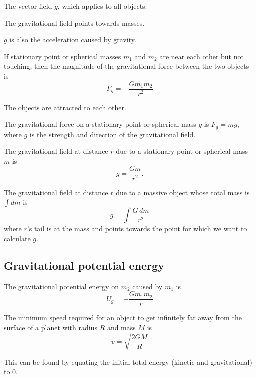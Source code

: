 \begin{definition}
  The vector field $g$, which applies to all objects.

  The gravitational field points towards masses.

	$g$ is also the acceleration caused by gravity.
\end{definition}

\begin{namedlaw}
  If stationary point or spherical masses $m_1$ and $m_2$ are near each other but not touching, then the magnitude of the gravitational force between the two objects is
  \[
    F_g = -\frac{G m_1 m_2}{r^2}
  \]

	The objects are attracted to each other.
\end{namedlaw}

\begin{law}
  The gravitational force on a stationary point or spherical mass $g$ is $F_g = mg$, where $g$ is the strength and direction of the gravitational field.
\end{law}

\begin{law}
  The gravitational field at distance $r$ due to a stationary point or spherical mass $m$ is
  \[
    g = \frac{Gm}{r^2}.
  \]

  The gravitational field at distance $r$ due to a massive object whose total mass is $\int dm$ is
  \[
    g = \int \frac{G \,dm}{r^2}
  \]
  where $r$'s tail is at the mass and points towards the point for which we want to calculate $g$.
\end{law}

\subsection{Gravitational potential energy}

\begin{definition}
	The gravitational potential energy on $m_2$ caused by $m_1$ is
	\[
		U_g = - \frac{G m_1 m_2}{r}
	\]
\end{definition}

\begin{theorem}
	The minimum speed required for an object to get infinitely far away from the surface of a planet with radius $R$ and mass $M$ is
	\[
		v = \sqrt{\frac{2GM}{R}}
	\]

	This can be found by equating the initial total energy (kinetic and gravitational) to 0.
\end{theorem}


